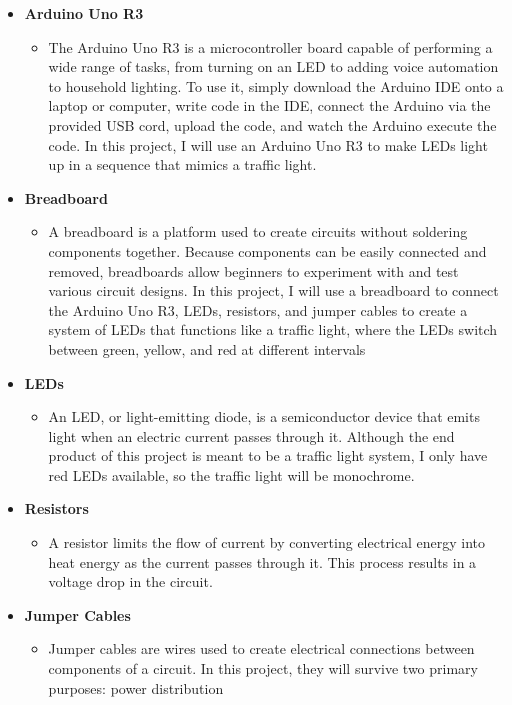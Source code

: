 \documentclass[12pt]{article}
\begin{document}
\begin{itemize}
  \item \textbf{Arduino Uno R3}
  \begin{itemize}
    \item The Arduino Uno R3 is a microcontroller board capable of performing a wide range of tasks, from turning on an LED to adding voice automation to household lighting.
    To use it, simply download the Arduino IDE onto a laptop or computer, write code in the IDE, connect the Arduino via the provided USB cord, upload the code, and watch
    the Arduino execute the code. In this project, I will use an Arduino Uno R3 to make LEDs light up in a sequence that mimics a traffic light.
  \end{itemize}
  \item \textbf{Breadboard}
  \begin{itemize}
    \item A breadboard is a platform used to create circuits without soldering components together. Because components can be easily connected and removed, breadboards allow 
    beginners to experiment with and test various circuit designs. In this project, I will use a breadboard to connect the Arduino Uno R3, LEDs, resistors, and jumper 
    cables to create a system of LEDs that functions like a traffic light, where the LEDs switch between green, yellow, and red at different intervals
  \end{itemize}
  \item \textbf{LEDs}
  \begin{itemize}
    \item An LED, or light-emitting diode, is a semiconductor device that emits light when an electric current passes through it. Although the end product of this project 
    is meant to be a traffic light system, I only have red LEDs available, so the traffic light will be monochrome.
  \end{itemize}
  \item \textbf{Resistors}
  \begin{itemize}
    \item A resistor limits the flow of current by converting electrical energy into heat energy as the current passes through it. This process results in a voltage drop in the circuit.
  \end{itemize}
  \item \textbf{Jumper Cables}
  \begin{itemize}
    \item Jumper cables are wires used to create electrical connections between components of a circuit. In this project, they will survive two primary purposes: power distribution

\end{itemize}
\end{itemize}
\end{document}
